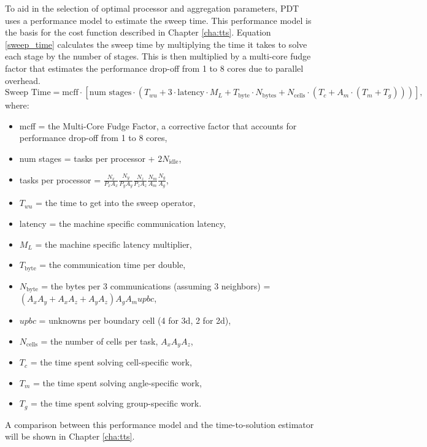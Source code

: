 \documentclass[times,final]{elsarticle}
\begin{document}
To aid in the selection of optimal processor and aggregation parameters, PDT uses a performance model to estimate the sweep time.
This performance model is the basis for the cost function described in Chapter \ref{cha:tts}.
Equation \ref{sweep_time} calculates the sweep time by multiplying the time it takes to solve each stage by the number of stages.
This is then multiplied by a multi-core fudge factor that estimates the performance drop-off from 1 to 8 cores due to parallel overhead.
\begin{equation}
\text{Sweep Time} = \text{mcff}\cdot[\text{num stages}\cdot(T_{wu} + 3\cdot \text{latency}\cdot M_L + T_{\text{byte}}\cdot N_{\text{bytes}} + N_{\text{cells}}\cdot ( T_c +  A_m\cdot (T_m + T_g)))],
\label{sweep_time}
\end{equation}
where:
\begin{itemize}
  \item mcff = the Multi-Core Fudge Factor, a corrective factor that accounts for performance drop-off from 1 to 8 cores,
  \item num stages = tasks per processor + $2N_{\text{idle}}$,
  \item tasks per processor = $\frac{N_x}{P_x A_x} \frac{N_y}{P_y A_y} \frac{N_z}{P_z A_z} \frac{N_m}{A_m} \frac{N_g}{A_g}$,
  \item $T_{wu}$ = the time to get into the sweep operator,
  \item latency = the machine specific communication latency,
  \item $M_L$ = the machine specific latency multiplier,
  \item $T_{\text{byte}}$ = the communication time per double,
  \item $N_{\text{byte}}$ = the bytes per 3 communications (assuming 3 neighbors) = $(A_x A_y + A_x A_z + A_y A_z)A_g A_m upbc $,
  \item $upbc$ = unknowns per boundary cell (4 for 3d, 2 for 2d),
  \item $N_{\text{cells}}$ = the number of cells per task, $A_x A_y A_z$,
  \item $T_c$ = the time spent solving cell-specific work,
  \item $T_m$ = the time spent solving angle-specific work,
  \item $T_g$ = the time spent solving group-specific work.
\end{itemize}
A comparison between this performance model and the time-to-solution estimator will be shown in Chapter \ref{cha:tts}. 
\end{document}
